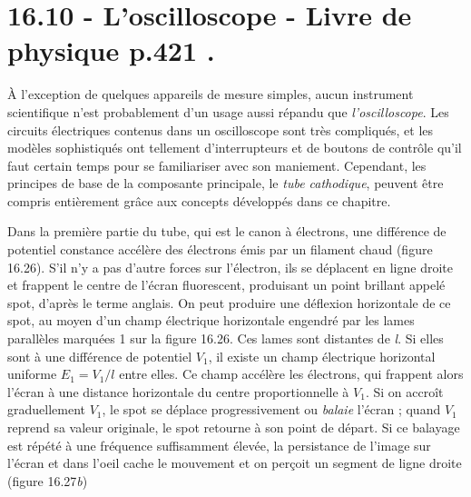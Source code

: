 \documentclass[../main.tex]{subfiles}
\begin{document}


\section{16.10 - L'oscilloscope - Livre de physique p.421 . }
    
À l'exception de quelques appareils de mesure simples, aucun instrument scientifique n'est probablement d'un usage aussi répandu que \textit{l'oscilloscope}. Les circuits électriques contenus dans un oscilloscope sont très compliqués, et les modèles sophistiqués ont tellement d'interrupteurs et de boutons de contrôle qu'il faut certain temps pour se familiariser avec son maniement. Cependant, les principes de base de la composante principale, le \textit{tube cathodique}, peuvent être compris entièrement grâce aux concepts développés dans ce chapitre.\\
\par Dans la première partie du tube, qui est le canon à électrons, une différence de potentiel constance accélère des électrons émis par un filament chaud (figure 16.26). S'il n'y a pas d'autre forces sur l'électron, ils se déplacent en ligne droite et frappent le centre de l'écran fluorescent, produisant un point brillant appelé spot, d'après le terme anglais. On peut produire une déflexion horizontale de ce spot, au moyen d'un champ électrique horizontale engendré par les lames parallèles marquées 1 sur la figure 16.26. Ces lames sont distantes de \textit{l}. Si elles sont à une différence de potentiel $V_1$, il existe un champ électrique horizontal uniforme $E_1 = V_1/l$ entre elles. Ce champ accélère les électrons, qui frappent alors l'écran à une distance horizontale du centre proportionnelle à $V_1$. Si on accroît graduellement $V_1$, le spot se déplace progressivement ou \textit{balaie} l'écran ; quand $V_1$ reprend sa valeur originale, le spot retourne à son point de départ. Si ce balayage est répété à une fréquence suffisamment élevée, la persistance de l'image sur l'écran et dans l'oeil cache le mouvement et on perçoit un segment de ligne droite (figure 16.27\textit{b})\\
\end{document}
